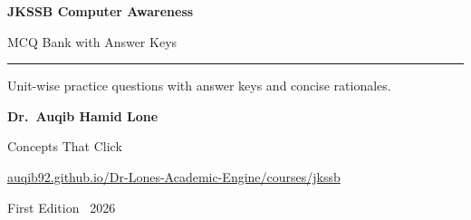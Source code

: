 \documentclass[11pt,a4paper,oneside]{report}
\renewcommand{\BAuthor}{Dr.\ Auqib Hamid Lone}
\renewcommand{\BWeb}{auqib92.github.io/Dr-Lones-Academic-Engine/courses/jkssb}
\renewcommand{\BWebURL}{https://auqib92.github.io/Dr-Lones-Academic-Engine/courses/jkssb/}
\begin{document}
\ifshowcover\makecover\fi

\thispagestyle{plain}
\begin{center}
  \vspace*{2.2cm}
  {\sffamily\bfseries\color{bookteal}\Huge JKSSB Computer Awareness\par}
  \vspace{0.4cm}
  {\sffamily\color{bookgolddark}\Large MCQ Bank with Answer Keys\par}
  \vspace{0.2cm}
  {\color{bookteal}\rule{6cm}{1.5pt}}
  \vspace{0.6cm}

  {\large Unit-wise practice questions with answer keys and concise rationales.\par}
  \vspace{1.4cm}

  {\sffamily\bfseries\large \BAuthor\par}
  \vspace{0.2cm}
  {\color{bookgolddark}\large Concepts That Click\par}
  \vspace{0.1cm}
  {\small \href{\BWebURL}{\BWeb}\par}
  \vspace{1.0cm}

  {\small First Edition \textperiodcentered\ 2026\par}
\end{center}
\clearpage
\end{document}
